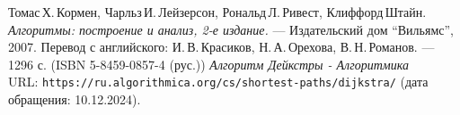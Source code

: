 \begin{thebibliography}{99}
Томас\,Х.\,Кормен, Чарльз\,И.\,Лейзерсон, Рональд\,Л.\,Ривест, Клиффорд\,Штайн.
{\itshape Алгоритмы: построение и анализ, 2-е издание.} --- Издательский дом \enquote{Вильямс}, 2007. Перевод с английского: И.\,В.\,Красиков, Н.\,А.\,Орехова, В.\,Н.\,Романов. --- 1296 с. (ISBN 5-8459-0857-4 (рус.))
{\itshape Алгоритм Дейкстры - Алгоритмика} \\URL: \texttt{https://ru.algorithmica.org/cs/shortest-paths/dijkstra/} (дата обращения: 10.12.2024).
\end{thebibliography}
\pagebreak
